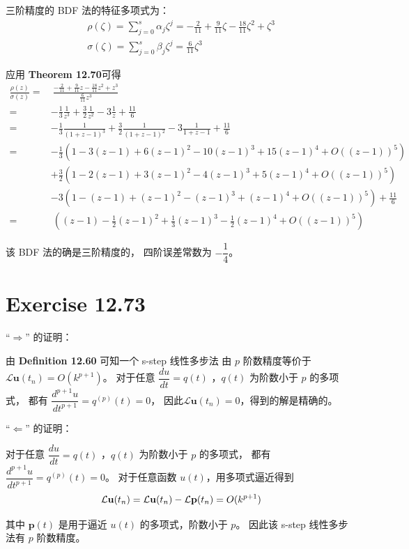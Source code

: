 \documentclass[a4paper]{article}
\begin{document}
\par 三阶精度的 BDF 法的特征多项式为：
\begin{gather}
    \rho(\zeta) = \sum_{j=0}^{s}\alpha_j \zeta^{j}
    =-\frac{2}{11} + \frac{9}{11} \zeta - \frac{18}{11} \zeta^2 + \zeta^3\\
    \sigma(\zeta) = \sum_{j=0}^{s}\beta_j \zeta^{j}
    =\frac{6}{11} \zeta^3
\end{gather}
\par 应用 \textbf{Theorem 12.70}可得
\begin{equation}
    \begin{aligned}
        \frac{\rho(z)}{\sigma(z)}
        =&\ \frac{-\frac{2}{11} + \frac{9}{11} z - \frac{18}{11} z^2 + z^3}{\frac{6}{11} z^3}\\
        =&-\frac{1}{3} \frac{1}{z^3} + \frac{3}{2} \frac{1}{z^2} - 3 \frac{1}{z} + \frac{11}{6}\\
        =&-\frac{1}{3} \frac{1}{(1+z-1)^3} + \frac{3}{2} \frac{1}{(1+z-1)^2} - 3 \frac{1}{1+z-1} + \frac{11}{6}\\
        =&-\frac{1}{3}\left(1-3(z-1)+6(z-1)^2-10(z-1)^3+15(z-1)^4+O((z-1))^5\right)\\
         &+\frac{3}{2}\left(1-2(z-1)+3(z-1)^2-4(z-1)^3+5(z-1)^4+O((z-1))^5\right)\\
         &-3\left(1-(z-1)+(z-1)^2-(z-1)^3+(z-1)^4+O((z-1))^5\right)+\frac{11}{6}\\
        =&\ \left(
            (z-1)-\frac{1}{2}(z-1)^2+\frac{1}{3}(z-1)^3-\frac{1}{2}(z-1)^4+O((z-1))^5
        \right)
    \end{aligned}
\end{equation}
\par 该 BDF 法的确是三阶精度的，
四阶误差常数为 $-\dfrac{1}{4}$。

\section*{Exercise 12.73}

\par “$\Rightarrow$” 的证明：
\par 由 \textbf{Definition 12.60} 可知一个 s-step 线性多步法
由 $p$ 阶数精度等价于 $\mathcal{L}\mathbf{u}(t_n)=O(k^{p+1})$。
对于任意 $\dfrac{d u}{dt}=q(t)$ ，$q(t)$ 为阶数小于 $p$ 的多项式，
都有 $\dfrac{d^{p+1} u}{dt^{p+1}}=q^{(p)}(t)=0$，
因此$\mathcal{L}\mathbf{u}(t_n)=0$，得到的解是精确的。

\par “$\Leftarrow$” 的证明：
\par 对于任意 $\dfrac{d u}{dt}=q(t)$ ，$q(t)$ 为阶数小于 $p$ 的多项式，
都有 $\dfrac{d^{p+1} u}{dt^{p+1}}=q^{(p)}(t)=0$。
对于任意函数 $u(t)$，用多项式逼近得到
\begin{equation}
    \mathcal{L}\mathbf{u}(t_n)
    =\mathcal{L}\mathbf{u}(t_n) - \mathcal{L}\mathbf{p}(t_n)\\
    =O(k^{p+1})
\end{equation}
\par 其中 $\mathbf{p}(t)$ 是用于逼近 $u(t)$ 的多项式，阶数小于 $p$。
因此该 s-step 线性多步法有 $p$ 阶数精度。


\printbibliography
\end{document}
